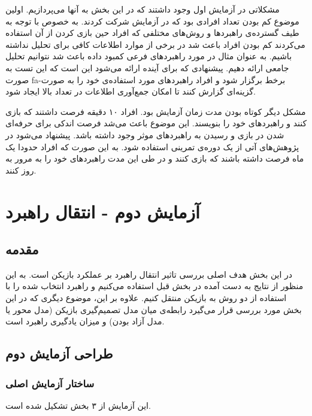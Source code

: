 \documentclass[twoside, a4paper,11pt]{book}
\numberwithin{equation}{chapter}
\numberwithin{table}{chapter}
\numberwithin{figure}{chapter}
\numberwithin{equation}{chapter}
\newcommand{\mls}[1]{\gls{fa-#1}\glsuseri{la-#1}}
\begin{document}
مشکلاتی در آزمایش اول وجود داشتند که در این بخش به آنها می‌پردازیم. اولین موضوع کم بودن تعداد افرادی بود که در آزمایش شرکت کردند. به خصوص با توجه به طیف گسترده‌ی راهبردها و روش‌های مختلفی که افراد حین بازی کردن از آن استفاده می‌کردند کم بودن افراد باعث شد در برخی از موارد اطلاعات کافی برای تحلیل نداشته باشیم. به عنوان مثال در مورد راهبردهای فرعی کمبود داده باعث شد نتوانیم تحلیل جامعی ارائه دهیم. پیشنهادی که برای آینده ارائه می‌شود این است که این تست به صورت \mls{برخط} برگزار شود و افراد راهبردهای مورد استفاده‌ی خود را به صورت گزینه‌ای گزارش کنند تا امکان جمع‌آوری اطلاعات در تعداد بالا ایجاد شود.

مشکل دیگر کوتاه بودن مدت زمان آزمایش بود. افراد ۱۰ دقیقه فرصت داشتند که بازی کنند و راهبردهای خود را بنویسند. این موضوع باعث می‌شد فرصت اندکی برای حرفه‌ای شدن در بازی و رسیدن به راهبردهای موثر وجود داشته باشد. پیشنهاد می‌شود در پژوهش‌های آتی از یک دوره‌ی تمرینی استفاده شود. به این صورت که افراد حدودا یک ماه فرصت داشته باشند که بازی کنند و در طی این مدت راهبردهای خود را به مرور به روز کنند.

\chapter{آزمایش دوم - انتقال راهبرد}
\label{chapter:PartTwoTransfer}
\thispagestyle{plain}

\section{مقدمه}
در این بخش هدف اصلی بررسی تاثیر انتقال راهبرد بر عملکرد بازیکن است. به این منظور از نتایج به دست آمده در بخش قبل استفاده می‌کنیم و راهبرد انتخاب شده را با استفاده از دو روش به بازیکن منتقل کنیم. علاوه بر این، موضوع دیگری که در این بخش مورد بررسی قرار می‌گیرد رابطه‌ی میان مدل تصمیم‌گیری بازیکن (مدل محور یا مدل آزاد بودن) و میزان یادگیری راهبرد است.

\section{طراحی آزمایش دوم}
\subsection{ساختار آزمایش اصلی} \label{partTwoMainTest}

این آزمایش از ۳ بخش تشکیل شده است.
\end{document}
